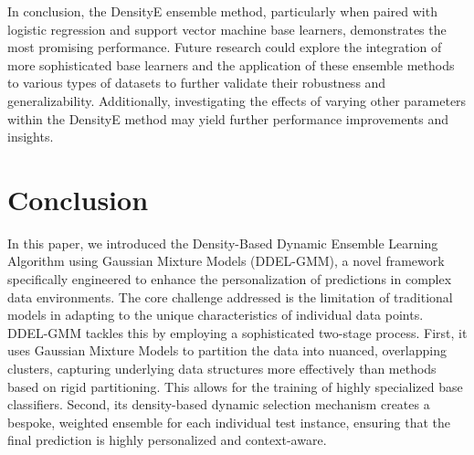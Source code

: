 \documentclass[lettersize,journal]{IEEEtran}
\begin{document}
	In conclusion, the DensityE ensemble method, particularly when paired
	with logistic regression and support vector machine base learners, demonstrates the most promising performance. Future research could explore the
	integration of more sophisticated base learners and the application of these
	ensemble methods to various types of datasets to further validate their robustness and generalizability. Additionally, investigating the effects of varying other parameters within the DensityE method may yield further performance improvements and insights.
	
	
	\section{Conclusion}
	\noindent
	
	In this paper, we introduced the Density-Based Dynamic Ensemble Learning Algorithm using Gaussian Mixture Models (DDEL-GMM), a novel framework specifically engineered to enhance the personalization of predictions in complex data environments. The core challenge addressed is the limitation of traditional models in adapting to the unique characteristics of individual data points. DDEL-GMM tackles this by employing a sophisticated two-stage process. First, it uses Gaussian Mixture Models to partition the data into nuanced, overlapping clusters, capturing underlying data structures more effectively than methods based on rigid partitioning. This allows for the training of highly specialized base classifiers. Second, its density-based dynamic selection mechanism creates a bespoke, weighted ensemble for each individual test instance, ensuring that the final prediction is highly personalized and context-aware.
	
\end{document}

